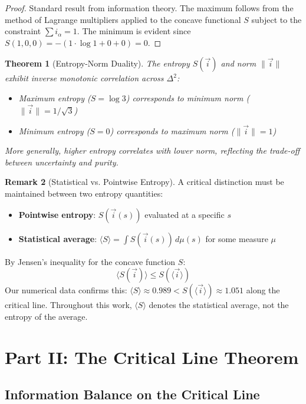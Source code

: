 \documentclass[12pt]{article}
\theoremstyle{plain}
\newtheorem{theorem}{Theorem}[section]
\theoremstyle{definition}
\newtheorem{remark}[theorem]{Remark}
\begin{document}
\begin{proof}
Standard result from information theory. The maximum follows from the method of Lagrange multipliers applied to the concave functional $S$ subject to the constraint $\sum i_\alpha = 1$. The minimum is evident since $S(1,0,0) = -(1 \cdot \log 1 + 0 + 0) = 0$.
\end{proof}

\begin{theorem}[Entropy-Norm Duality]\label{thm:entropy_norm}
The entropy $S(\vec{i})$ and norm $\|\vec{i}\|$ exhibit inverse monotonic correlation across $\Delta^2$:
\begin{itemize}
\item Maximum entropy ($S = \log 3$) corresponds to minimum norm ($\|\vec{i}\| = 1/\sqrt{3}$)
\item Minimum entropy ($S = 0$) corresponds to maximum norm ($\|\vec{i}\| = 1$)
\end{itemize}
More generally, higher entropy correlates with lower norm, reflecting the trade-off between uncertainty and purity.
\end{theorem}

\begin{remark}[Statistical vs. Pointwise Entropy]
A critical distinction must be maintained between two entropy quantities:
\begin{itemize}
\item \textbf{Pointwise entropy}: $S(\vec{i}(s))$ evaluated at a specific $s$
\item \textbf{Statistical average}: $\langle S \rangle = \int S(\vec{i}(s)) \, d\mu(s)$ for some measure $\mu$
\end{itemize}
By Jensen's inequality for the concave function $S$:
$$\langle S(\vec{i}) \rangle \leq S(\langle \vec{i} \rangle)$$
Our numerical data confirms this: $\langle S \rangle \approx 0.989 < S(\langle \vec{i} \rangle) \approx 1.051$ along the critical line. Throughout this work, $\langle S \rangle$ denotes the statistical average, not the entropy of the average.
\end{remark}

\section{Part II: The Critical Line Theorem}

\subsection{Information Balance on the Critical Line}
\end{document}
